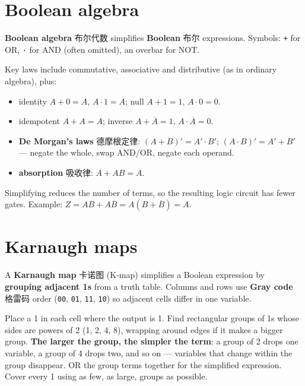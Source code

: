 \documentclass[11pt]{article}
\begin{document}
\section*{Boolean algebra}

\textbf{Boolean algebra} 布尔代数 simplifies \textbf{Boolean} 布尔 expressions. Symbols: \texttt{+} for OR, \texttt{·} for AND (often omitted), an overbar for NOT.

Key laws include commutative, associative and distributive (as in ordinary algebra), plus:

\begin{itemize}
\item identity $A + 0 = A$, $A \cdot 1 = A$; null $A + 1 = 1$, $A \cdot 0 = 0$.

\item idempotent $A + A = A$; inverse $A + \overline{A} = 1$, $A \cdot \overline{A} = 0$.

\item \textbf{De Morgan's laws} 德摩根定律: $(A + B)' = A' \cdot B'$; $(A \cdot B)' = A' + B'$ — negate the whole, swap AND/OR, negate each operand.

\item \textbf{absorption} 吸收律: $A + AB = A$.

\end{itemize}

Simplifying reduces the number of terms, so the resulting logic circuit has fewer gates. Example: $Z = AB + A\overline{B} = A(B + \overline{B}) = A$.

\section*{Karnaugh maps}

A \textbf{Karnaugh map} 卡诺图 (K-map) simplifies a Boolean expression by \textbf{grouping adjacent 1s} from a truth table. Columns and rows use \textbf{Gray code} 格雷码 order (\texttt{00}, \texttt{01}, \texttt{11}, \texttt{10}) so adjacent cells differ in one variable.

Place a 1 in each cell where the output is 1. Find rectangular groups of 1s whose sides are powers of 2 (1, 2, 4, 8), wrapping around edges if it makes a bigger group. \textbf{The larger the group, the simpler the term}: a group of 2 drops one variable, a group of 4 drops two, and so on — variables that change within the group disappear. OR the group terms together for the simplified expression. Cover every 1 using as few, as large, groups as possible.
\end{document}
